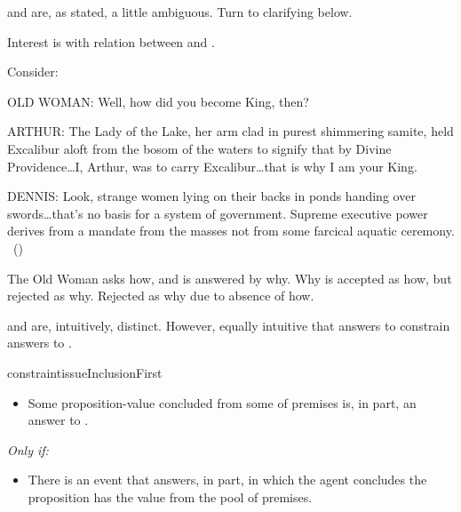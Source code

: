\begin{note}
  \qWhy{} and \qHow{} are, as stated, a little ambiguous.
  Turn to clarifying below.

  Interest is with relation between \qWhy{} and \qHow{}.
\end{note}

\begin{note}
  Consider:

  \begin{scenario}[England AD 932]
    \vspace{-\baselineskip}
    \begin{screenplay}
    \item[OLD WOMAN:]
      Well, how did you become King, then?
    \item[ARTHUR:]
      The Lady of the Lake, her arm clad in purest shimmering samite, held Excalibur aloft from the bosom of the waters to signify that by Divine Providence\space\dots\space I, Arthur, was to carry Excalibur\dots\space that is why I am your King.
    \item[DENNIS:]
      Look, strange women lying on their backs in ponds handing over swords\space\dots\space that's no basis for a system of government.
      Supreme executive power derives from a mandate from the masses not from some farcical aquatic ceremony.%
      \mbox{ }\hfill\mbox{(\cite[8--9]{Cleese:1974aa})}
    \end{screenplay}
    \vspace{-\baselineskip}
  \end{scenario}

  The Old Woman asks how, and is answered by why.
  Why is accepted as how, but rejected as why.
  Rejected as why due to absence of how.
\end{note}

\begin{note}
  \qWhy{} and \qHow{} are, intuitively, distinct.
  However, equally intuitive that answers to \qHow{} constrain answers to \qWhy{}.
\end{note}

\begin{note}
  \begin{restatable}[\issueInclusion{}]{constraint}{issueInclusionFirst}
    \label{issue:why-inc-in-how}
    \mbox{ }
    \vspace{-\baselineskip}
    \begin{itemize}
    \item
      Some proposition-value concluded from some \poP{} of premises is, in part, an answer to \qWhy{}.
    \end{itemize}
    \emph{Only if:}
    \begin{itemize}
    \item
      There is an event that answers, in part, \qHow{} in which the agent concludes the proposition has the value from the pool of premises.
    \end{itemize}
    \vspace{-\baselineskip}
  \end{restatable}
\end{note}

